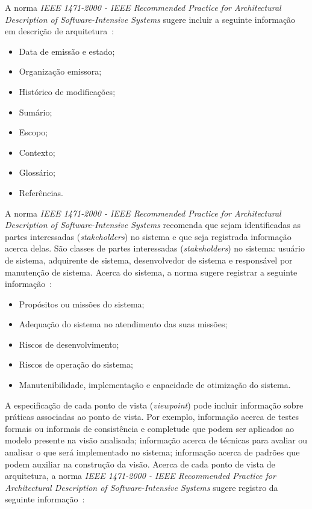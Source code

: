 A norma \emph{IEEE 1471-2000 - IEEE Recommended Practice for Architectural Description of Software-Intensive Systems} sugere incluir a seguinte informação em descrição de arquitetura~\cite{ISO_1471}: 

\begin{itemize}
    \item Data de emissão e estado;
    \item Organização emissora;
    \item Histórico de modificações;
    \item Sumário;
    \item Escopo;
    \item Contexto;
    \item Glossário;
    \item Referências.

\end{itemize}

A norma \emph{IEEE 1471-2000 - IEEE Recommended Practice for Architectural Description of Software-Intensive Systems} recomenda que sejam identificadas as partes interessadas (\emph{stakeholders}) no sistema e que seja registrada informação acerca delas. São classes de partes interessadas (\emph{stakeholders}) no sistema: usuário de sistema, adquirente de sistema, desenvolvedor de sistema e responsável por manutenção de sistema. Acerca do sistema, a norma sugere registrar a seguinte informação~\cite{ISO_1471}: 

\begin{itemize}
    \item Propósitos ou missões do sistema;
    \item Adequação do sistema no atendimento das suas missões;
    \item  Riscos de desenvolvimento;
    \item  Riscos de operação do sistema;
    \item Manutenibilidade, implementação e capacidade de otimização do sistema.

\end{itemize}

A especificação de cada ponto de vista (\emph{viewpoint}) pode incluir informação sobre práticas associadas ao ponto de vista. Por exemplo, informação acerca de testes formais ou informais de consistência e completude que podem ser aplicados ao modelo presente na visão analisada; informação acerca de técnicas para avaliar ou analisar o que será implementado no sistema; informação acerca de padrões que podem auxiliar na construção da visão. Acerca de cada ponto de vista de arquitetura, a norma \emph{IEEE 1471-2000 - IEEE Recommended Practice for Architectural Description of Software-Intensive Systems} sugere registro da seguinte informação~\cite{ISO_1471}:

